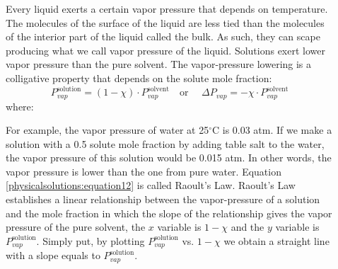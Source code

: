 \documentclass[main.tex]{subfiles}
\newcommand\chapterlabel{physicalsolutions}
\begin{document}
\begin{description}
\item[] 
Every liquid exerts a certain vapor pressure that depends on temperature. The molecules of the surface of the liquid are less tied than the molecules of the interior part of the liquid called the bulk. As such, they can scape producing what we call vapor pressure of the liquid. Solutions exert lower vapor pressure than the pure solvent. The vapor-pressure lowering is a colligative property that depends on the solute mole fraction:
\begin{equation}
\boxed{ P_{vap}^{\text{solution}}=(1-  \chi )\cdot P_{vap}^{\text{solvent}} 	}
\quad  \text{or }\quad 
\boxed{\Delta P_{vap} =  -  \chi \cdot P_{vap}^{\text{solvent}}  }
\label{\chapterlabel:equation12}
\end{equation}
where:
For example, the vapor pressure of water at 25$^{\circ}$C  is 0.03 atm. If we make a solution with a 0.5 solute mole fraction by adding table salt to the water, the vapor pressure of this solution would be 0.015 atm. In other words, the vapor pressure is lower than the one from pure water.  Equation \ref{\chapterlabel:equation12} is called Raoult's Law.
Raoult's Law establishes a linear relationship between the vapor-pressure of a solution and the mole fraction in which the slope of the relationship gives the vapor pressure of the pure solvent, the $x$ variable is $1-\chi$ and the $y$ variable is $P_{vap}^{\text{solution}}$. Simply put, by plotting $P_{vap}^{\text{solution}}$ vs. $1-\chi$ we obtain a straight line with a slope equals to $P_{vap}^{\text{solution}}$.



\end{description}
\end{document}
